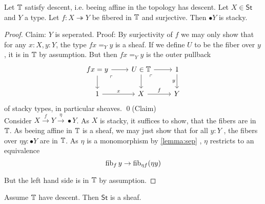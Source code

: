 \documentclass{article}
\newcommand{\St}{\mathsf{St}}
\begin{document}
\begin{lemma}
Let $\mathbb{T}$ satisfy descent, i.e. beeing affine in the topology has descent.
Let $X \in \St$ and $Y$ a type.	Let $f : X \twoheadrightarrow Y$ be fibered in $\mathbb{T}$ and surjective. Then $\bullet Y$ is stacky.
\end{lemma}
\begin{proof}
Claim: $Y$ is seperated. Proof: By surjectivity of $f$ we may only show that for any $x : X, y : Y$, the type $f x =_Y y$ is a sheaf. If we define $U$ to be the fiber over $y$, it is in $\mathbb{T}$ by assumption. But then $f x =_Y y$ is the outer pullback
\[\begin{tikzcd}
	{f x = y} & {U \in\bT} & 1 \\
	\arrow["\ulcorner"{anchor=center, pos=0.125}, draw=none, from=1-1, to=2-2]
	1 & X & Y
	\arrow[from=1-1, to=1-2]
	\arrow[from=1-1, to=2-1]
	\arrow[from=1-2, to=1-3]
	\arrow[from=1-2, to=2-2]
	\arrow["\ulcorner"{anchor=center, pos=0.125}, draw=none, from=1-2, to=2-3]
	\arrow["y"', from=1-3, to=2-3]
	\arrow["x", from=2-1, to=2-2]
	\arrow["f", from=2-2, to=2-3]
\end{tikzcd}\]
of stacky types, in particular sheaves. \qed(Claim) \\

	Consider $X \overset{f}{\to} Y \overset{\eta}{\to} \bullet Y$. As $X$ is stacky, it suffices to show, that the fibers are in $\mathbb{T}$. As beeing affine in $\mathbb{T}$ is  a sheaf, we may just show that for all $y : Y$ , the fibers over $\eta y : \bullet Y$ are in $\mathbb{T}$. As $\eta$ is a monomorphism by \ref{lemma:sep} , $\eta$ restricts to an equivalence
	\[
	\operatorname{fib}_f y \to \operatorname{fib}_{ \eta f}(\eta y)
	\]

	But the left hand side is in $\mathbb{T}$ by assumption. 
\end{proof}
\begin{theorem}
	Assume $\mathbb{T}$ have descent. Then $\St$ is a sheaf.
\end{theorem}
\end{document}
